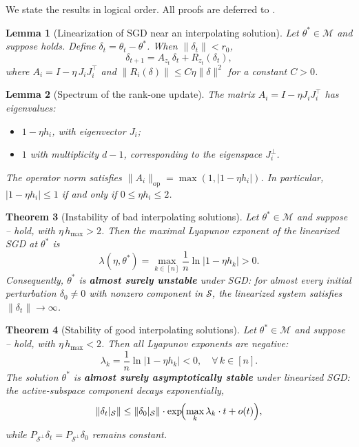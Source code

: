 \documentclass[11pt,a4paper]{article}
\newtheorem{theorem}{Theorem}
\newtheorem{lemma}[theorem]{Lemma}
\theoremstyle{definition}
\theoremstyle{remark}
\newcommand{\cM}{\mathcal{M}}
\newcommand{\cS}{\mathcal{S}}
\begin{document}
We state the results in logical order.  All proofs are deferred to .

\begin{lemma}[Linearization of SGD near an interpolating solution]\label{lem:lin}
  Let $\theta^* \in \cM$ and suppose  holds.
  Define $\delta_t = \theta_t - \theta^*$.  When $\|\delta_t\| < r_0$,
  \[
    \delta_{t+1} = A_{z_t}\,\delta_t + R_{z_t}(\delta_t),
  \]
  where $A_i = I - \eta\,J_i J_i^\top$ and
  $\|R_i(\delta)\| \leq C\eta\|\delta\|^2$ for a constant $C > 0$.
\end{lemma}

\begin{lemma}[Spectrum of the rank-one update]\label{lem:rank1}
  The matrix $A_i = I - \eta J_i J_i^\top$ has eigenvalues:
  \begin{itemize}
    \item $1 - \eta h_i$, with eigenvector $J_i$;
    \item $1$ with multiplicity $d-1$, corresponding to the eigenspace $J_i^\perp$.
  \end{itemize}
  The operator norm satisfies
  $\|A_i\|_{\mathrm{op}} = \max(1, |1 - \eta h_i|)$.
  In particular, $|1 - \eta h_i| \leq 1$ if and only if $0 \leq \eta h_i \leq 2$.
\end{lemma}

\begin{theorem}[Instability of bad interpolating solutions]\label{thm:instability}
  Let $\theta^* \in \cM$ and suppose -- hold, with
  $\eta\, h_{\max} > 2$.  Then the maximal Lyapunov exponent of the linearized SGD
  at $\theta^*$ is
  \[
    \lambda(\eta, \theta^*) = \max_{k \in [n]} \frac{1}{n}\ln|1 - \eta h_k| > 0.
  \]
  Consequently, $\theta^*$ is \textbf{almost surely unstable} under SGD: for almost
  every initial perturbation $\delta_0 \neq 0$ with nonzero component in $\cS$, the
  linearized system satisfies $\|\delta_t\| \to \infty$.
\end{theorem}

\begin{theorem}[Stability of good interpolating solutions]\label{thm:stability}
  Let $\theta^* \in \cM$ and suppose -- hold, with
  $\eta\, h_{\max} < 2$.  Then all Lyapunov exponents are negative:
  \[
    \lambda_k = \frac{1}{n}\ln|1 - \eta h_k| < 0,
    \quad \forall\, k \in [n].
  \]
  The solution $\theta^*$ is \textbf{almost surely asymptotically stable} under
  linearized SGD: the active-subspace component decays exponentially,
  \[
    \|\delta_t|_{\cS}\| \leq \|\delta_0|_{\cS}\| \cdot
    \exp\!\Bigl(\max_k \lambda_k \cdot t + o(t)\Bigr),
  \]
  while $P_{\cS^\perp}\delta_t = P_{\cS^\perp}\delta_0$ remains constant.
\end{theorem}
\end{document}

